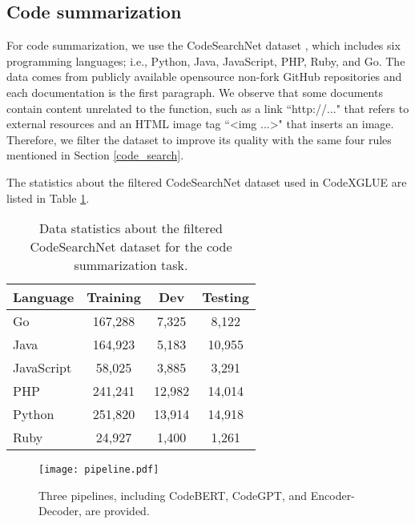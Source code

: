 \documentclass[sigconf,nonacm,screen]{acmart}
\begin{document}
\subsection{Code summarization}
\label{Code_summarization_dataset}
For code summarization, we use the CodeSearchNet dataset \cite{husain2019codesearchnet}, which includes six programming languages; i.e., Python, Java, JavaScript, PHP, Ruby, and Go. The data comes from publicly available opensource non-fork GitHub repositories and each documentation is the first paragraph. 
We observe that some documents contain content unrelated to the function, such as a link ``http://..." that refers to external resources and an HTML image tag ``<img ...>" that inserts an image. Therefore, we filter the dataset  to improve its quality with the same four rules mentioned in Section \ref{code_search}.









The statistics about the filtered CodeSearchNet dataset used in CodeXGLUE are listed in Table \ref{table-codesearchnet-data-statistic}.

\begin{table}[h]
\begin{center}
\caption{Data statistics about the filtered CodeSearchNet dataset for the code summarization task.}
\label{table-codesearchnet-data-statistic}
		\begin{tabular}{lccc}
			\toprule
			Language & Training & Dev & Testing \\
\midrule
			Go&167,288&7,325&8,122\\
			Java&164,923&5,183&10,955\\
			JavaScript&58,025&3,885&3,291\\
			PHP&241,241&12,982&14,014\\
			Python&251,820&13,914&14,918\\
			Ruby&24,927&1,400&1,261\\
			\bottomrule
		\end{tabular}
\end{center}
\end{table}

\begin{figure*}
    \centering
    \texttt{[image: pipeline.pdf]}
    \caption{Three pipelines, including CodeBERT, CodeGPT, and Encoder-Decoder, are provided.}
    \label{fig:pipeline}
\end{figure*}
\end{document}
